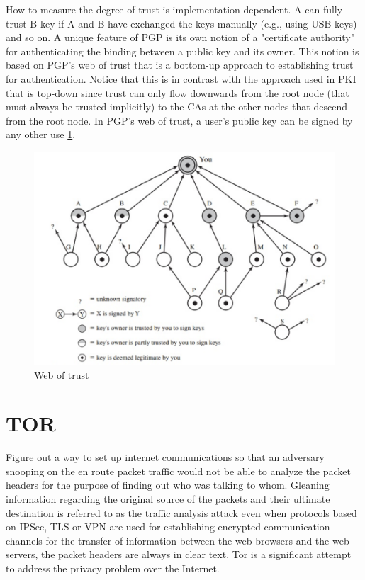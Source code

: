 How to measure the degree of trust is implementation dependent. A can fully trust B key if A and B have exchanged the keys manually (e.g., using USB keys) and so on.
A unique feature of PGP is its own notion of a "certificate authority" for authenticating the binding between a public key and its owner. This notion is based on PGP's web of trust that is a bottom-up approach to establishing trust for authentication. Notice that this is in contrast with the approach used in PKI that is top-down since trust can only flow downwards from the root node (that must always be trusted implicitly) to the CAs at the other nodes that descend from the root node. In PGP's web of trust, a user's public key can be signed by any other use \ref{fig:pgp-web-of-trust}.

\begin{figure}
	\centering
	\includegraphics[width=0.7\linewidth]{Images/Chapter7/pgp-web-of-trust}
	\caption{Web of trust}
	\label{fig:pgp-web-of-trust}
\end{figure}


\section{TOR}

Figure out a way to set up internet communications so that an adversary snooping on the en route packet traffic would not be able to analyze the packet headers for the purpose of finding out who was talking to whom. Gleaning information regarding the original source of the packets and their ultimate destination is referred to as the traffic analysis attack even when protocols based on IPSec, TLS or VPN are used for establishing encrypted communication channels for the transfer of information between the web browsers and the web servers, the packet headers are always in clear text. Tor is a significant attempt to address the privacy problem over the Internet.

